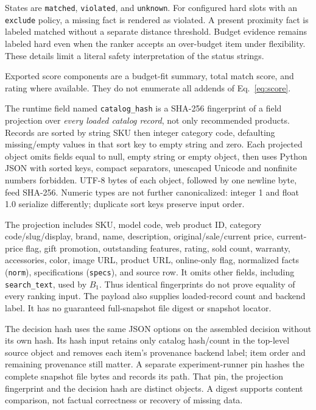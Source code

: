 \documentclass[conference,a4paper]{IEEEtran}
\newcommand{\code}[1]{\texttt{#1}}
\begin{document}
States are \code{matched}, \code{violated}, and \code{unknown}. For configured hard slots with an \code{exclude} policy, a missing fact is rendered as violated. A present proximity fact is labeled matched without a separate distance threshold. Budget evidence remains labeled hard even when the ranker accepts an over-budget item under flexibility. These details limit a literal safety interpretation of the status strings.

Exported score components are a budget-fit summary, total match score, and rating where available. They do not enumerate all addends of Eq.~\eqref{eq:score}.

The runtime field named \code{catalog\_hash} is a SHA-256 fingerprint of a field projection over \emph{every loaded catalog record}, not only recommended products. Records are sorted by string SKU then integer category code, defaulting missing/empty values in that sort key to empty string and zero. Each projected object omits fields equal to null, empty string or empty object, then uses Python JSON with sorted keys, compact separators, unescaped Unicode and nonfinite numbers forbidden. UTF-8 bytes of each object, followed by one newline byte, feed SHA-256. Numeric types are not further canonicalized: integer 1 and float 1.0 serialize differently; duplicate sort keys preserve input order.

The projection includes SKU, model code, web product ID, category code/slug/display, brand, name, description, original/sale/current price, current-price flag, gift promotion, outstanding features, rating, sold count, warranty, accessories, color, image URL, product URL, online-only flag, normalized facts (\code{norm}), specifications (\code{specs}), and source row. It omits other fields, including \code{search\_text}, used by $B_1$. Thus identical fingerprints do not prove equality of every ranking input. The payload also supplies loaded-record count and backend label. It has no guaranteed full-snapshot file digest or snapshot locator.

The decision hash uses the same JSON options on the assembled decision without its own hash. Its hash input retains only catalog hash/count in the top-level source object and removes each item's provenance backend label; item order and remaining provenance still matter. A separate experiment-runner pin hashes the complete snapshot file bytes and records its path. That pin, the projection fingerprint and the decision hash are distinct objects. A digest supports content comparison, not factual correctness or recovery of missing data.
\end{document}
